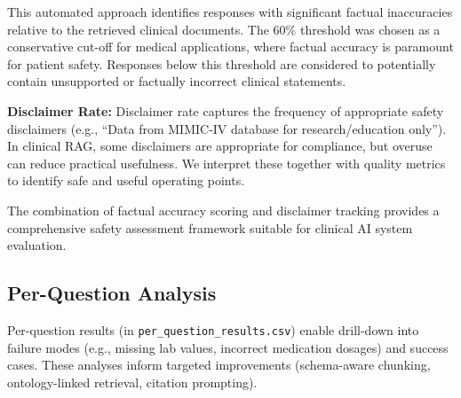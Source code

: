This automated approach identifies responses with significant factual inaccuracies relative to the retrieved clinical documents. The 60\% threshold was chosen as a conservative cut-off for medical applications, where factual accuracy is paramount for patient safety. Responses below this threshold are considered to potentially contain unsupported or factually incorrect clinical statements.

\textbf{Disclaimer Rate:}
Disclaimer rate captures the frequency of appropriate safety disclaimers (e.g., ``Data from MIMIC-IV database for research/education only''). In clinical RAG, some disclaimers are appropriate for compliance, but overuse can reduce practical usefulness. We interpret these together with quality metrics to identify safe and useful operating points.

The combination of factual accuracy scoring and disclaimer tracking provides a comprehensive safety assessment framework suitable for clinical AI system evaluation.

\subsection{Per-Question Analysis}
Per-question results (in \texttt{per\_question\_results.csv}) enable drill-down into failure modes (e.g., missing lab values, incorrect medication dosages) and success cases. These analyses inform targeted improvements (schema-aware chunking, ontology-linked retrieval, citation prompting).

